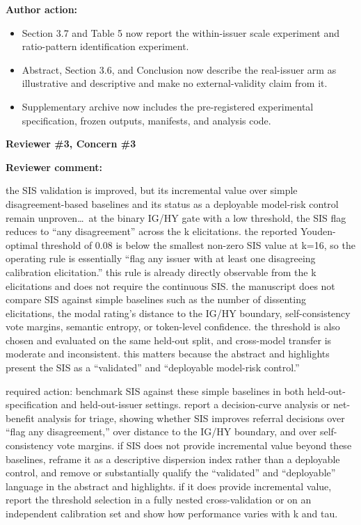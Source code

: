 \documentclass[11pt]{article}
\newcommand{\rvcomment}[1]{{\color{ReviewerGreen}#1}}
\newcommand{\concern}[1]{\textbf{\color{ReviewerGreen}#1}}
\begin{document}
\textbf{Author action:}

\begin{itemize}
\item Section 3.7 and Table 5 now report the within-issuer scale experiment and ratio-pattern
identification experiment.
\item Abstract, Section 3.6, and Conclusion now describe the real-issuer arm as illustrative
and descriptive and make no external-validity claim from it.
\item Supplementary archive now includes the pre-registered experimental specification,
frozen outputs, manifests, and analysis code.
\end{itemize}

\vspace{4pt}

\concern{Reviewer \#3, Concern \#3}

\concern{Reviewer comment:}

\rvcomment{the SIS validation is improved, but its incremental value over simple
disagreement-based baselines and its status as a deployable model-risk control remain unproven\dots\
at the binary IG/HY gate with a low threshold, the SIS flag reduces to ``any disagreement'' across
the k elicitations. the reported Youden-optimal threshold of 0.08 is below the smallest non-zero SIS
value at k=16, so the operating rule is essentially ``flag any issuer with at least one disagreeing
calibration elicitation.'' this rule is already directly observable from the k elicitations and does
not require the continuous SIS. the manuscript does not compare SIS against simple baselines such as
the number of dissenting elicitations, the modal rating's distance to the IG/HY boundary,
self-consistency vote margins, semantic entropy, or token-level confidence. the threshold is also
chosen and evaluated on the same held-out split, and cross-model transfer is moderate and
inconsistent. this matters because the abstract and highlights present the SIS as a ``validated'' and
``deployable model-risk control.''}

\rvcomment{required action: benchmark SIS against these simple baselines in both
held-out-specification and held-out-issuer settings. report a decision-curve analysis or net-benefit
analysis for triage, showing whether SIS improves referral decisions over ``flag any disagreement,''
over distance to the IG/HY boundary, and over self-consistency vote margins. if SIS does not provide
incremental value beyond these baselines, reframe it as a descriptive dispersion index rather than a
deployable control, and remove or substantially qualify the ``validated'' and ``deployable'' language
in the abstract and highlights. if it does provide incremental value, report the threshold selection
in a fully nested cross-validation or on an independent calibration set and show how performance
varies with k and tau.}
\end{document}
